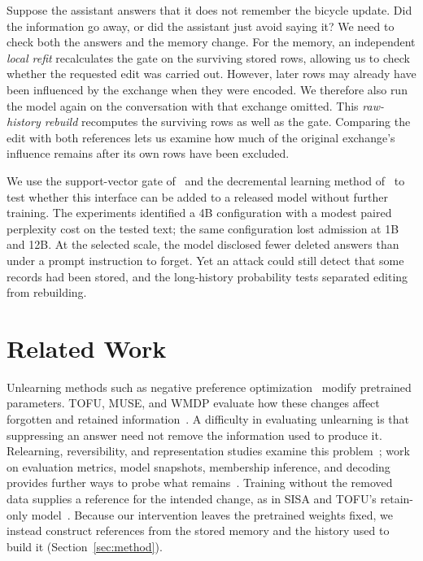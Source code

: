 Suppose the assistant answers that it does not remember the bicycle update.
Did the information go away, or did the assistant just avoid saying it? We
need to check both the answers and the memory change. For the memory, an
independent \emph{local refit} recalculates the gate on the surviving stored
rows, allowing us to check whether the requested edit was carried out.
However, later rows may already have been influenced by the exchange when
they were encoded. We therefore also run the model again on the conversation
with that exchange omitted. This \emph{raw-history rebuild} recomputes the
surviving rows as well as the gate. Comparing the edit with both references
lets us examine how much of the original exchange's influence remains after
its own rows have been excluded.

We use the support-vector gate of~\citet{svattn} and the decremental learning
method of~\citet{cp2000} to test whether this interface can be added to a
released model without further training. The experiments identified a 4B
configuration with a modest paired perplexity cost on the tested text; the
same configuration lost admission at 1B and 12B. At the selected scale, the
model disclosed fewer deleted answers than under a prompt instruction to
forget. Yet an attack could still detect that some records had been stored,
and the long-history probability tests separated editing from rebuilding.

\section{Related Work}\label{sec:related}

Unlearning methods such as negative preference
optimization~\citep{zhang2024npo} modify pretrained parameters. TOFU, MUSE,
and WMDP evaluate how these changes affect forgotten and retained
information~\citep{tofu,muse,wmdp}. A difficulty in evaluating unlearning is
that suppressing an answer need not remove the information used to produce
it. Relearning, reversibility, and representation studies examine this
problem~\citep{relearn,reversibility,thaker}; work on evaluation metrics,
model snapshots, membership inference, and decoding provides further ways
to probe what remains~\citep{lynch,snapshot,lira,leakk}. Training without the
removed data supplies a reference for the intended change, as in SISA and
TOFU's retain-only model~\citep{sisa,tofu}. Because our intervention leaves
the pretrained weights fixed, we instead construct references from the
stored memory and the history used to build it (Section~\ref{sec:method}).

